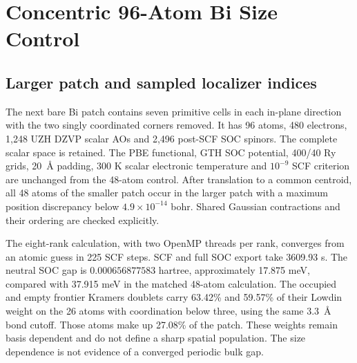 \documentclass[11pt]{article}
\begin{document}
\clearpage
\section{Concentric 96-Atom Bi Size Control}
\label{sec:si-bismuth96}
\subsection{Larger patch and sampled localizer indices}
The next bare Bi patch contains seven primitive cells in each
in-plane direction with the two singly coordinated corners removed.
It has 96 atoms, 480 electrons, 1,248 UZH DZVP scalar AOs and
2,496 post-SCF SOC spinors. The complete scalar space is retained.
The PBE functional, GTH SOC potential, 400/40 Ry grids, 20~\AA{}
padding, 300 K scalar electronic temperature and $10^{-9}$ SCF
criterion are unchanged from the 48-atom control.
After translation to a common centroid, all 48 atoms of the
smaller patch occur in the larger patch with a maximum position
discrepancy below $4.9\times10^{-14}$ bohr. Shared Gaussian
contractions and their ordering are checked explicitly.

The eight-rank calculation, with two OpenMP threads per rank,
converges from an atomic guess in 225 SCF steps. SCF and full
SOC export take 3609.93 s. The neutral SOC gap is
$0.000656877583$ hartree, approximately 17.875 meV, compared
with 37.915 meV in the matched 48-atom calculation.
The occupied and empty frontier Kramers doublets carry
63.42\% and 59.57\% of their Lowdin weight on the 26 atoms
with coordination below three, using the same 3.3~\AA{}
bond cutoff. Those atoms make up 27.08\% of the patch.
These weights remain basis dependent and do not define a
sharp spatial population. The size dependence is not evidence
of a converged periodic bulk gap.
\end{document}
